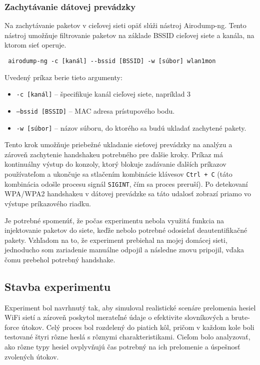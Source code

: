 \documentclass[12pt, twoside]{book}
\begin{document}
\subsubsection{Zachytávanie dátovej prevádzky} 
Na zachytávanie paketov v cieľovej sieti opäť slúži nástroj Airodump-ng. Tento nástroj umožňuje filtrovanie paketov na základe BSSID cieľovej siete a kanála, na ktorom sieť operuje.

\begin{verbatim} airodump-ng -c [kanál] --bssid [BSSID] -w [súbor] wlan1mon \end{verbatim}

Uvedený príkaz berie tieto argumenty: 

\begin{itemize} 
\item \texttt{-c [kanál]} – špecifikuje kanál cieľovej siete, napríklad 3 
\item \texttt{--bssid [BSSID]} – MAC adresa prístupového bodu. 
\item \texttt{-w [súbor]} – názov súboru, do ktorého sa budú ukladať zachytené pakety. 
\end{itemize}

Tento krok umožňuje priebežné ukladanie sieťovej prevádzky na analýzu a zároveň zachytenie handshakeu potrebného pre ďalšie kroky. Príkaz má kontinuálny výstup do konzoly, ktorý blokuje zadávanie ďalších príkazov používateľom a ukončuje sa stlačením kombinácie klávesov \texttt{Ctrl + C} (táto kombinácia odošle procesu signál \texttt{SIGINT}, čím sa proces preruší). Po detekovaní WPA/WPA2 handshakeu v dátovej prevádzke sa táto udalosť zobrazí priamo vo výstupe príkazového riadku.

Je potrebné spomenúť, že počas experimentu nebola využitá funkcia na injektovanie paketov do siete, keďže nebolo potrebné odosielať deautentifikačné pakety. Vzhľadom na to, že experiment prebiehal na mojej domácej sieti, jednoducho som zariadenie manuálne odpojil a následne znovu pripojil, vďaka čomu prebehol potrebný handshake.

\subsection{Stavba experimentu}
Experiment bol navrhnutý tak, aby simuloval realistické scenáre prelomenia hesiel WiFi sietí a zároveň poskytol merateľné údaje o efektivite slovníkových a brute-force útokov. Celý proces bol rozdelený do piatich kôl, pričom v každom kole boli testované štyri rôzne heslá s rôznymi charakteristikami. Cieľom bolo analyzovať, ako rôzne typy hesiel ovplyvňujú čas potrebný na ich prelomenie a úspešnosť zvolených útokov.
\end{document}
